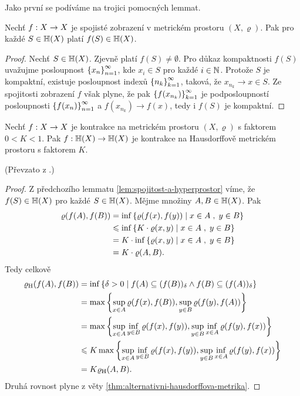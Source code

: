 Jako první se podíváme na trojici pomocných lemmat.
\begin{lemma}\label{lem:spojitost-a-hyperprostor}
    Nechť $f:X \rightarrow X$ je spojisté zobrazení v metrickém prostoru $(X,\varrho)$. Pak pro každé $S\in\mathbb{H}(X)$ platí $f(S)\in\mathbb{H}(X)$.
\end{lemma}
\begin{proof}
    Nechť $S\in\mathbb{H}(X)$. Zjevně platí $f(S)\neq\emptyset$. Pro důkaz kompaktnosti $f(S)$ uvažujme posloupnost $\left\{x_n\right\}_{n=1}^\infty$, kde $x_i\in S$ pro každé $i\in\mathbb{N}$. Protože $S$ je kompaktní, existuje posloupnost indexů $\left\{n_k\right\}_{k=1}^\infty$, taková, že $x_{n_k}\to x\in S$. Ze spojitosti zobrazení $f$ však plyne, že pak $\left\{f(x_{n_k})\right\}_{k=1}^\infty$ je podposloupností posloupnosti $\left\{f(x_n)\right\}_{n=1}^\infty$ a $f(x_{n_k})\to f(x)$, tedy i $f(S)$ je kompaktní.
\end{proof}
\begin{lemma}\label{lem:kontrakce-a-hyperprostor}
    Nechť $f:X \rightarrow X$ je kontrakce na metrickém prostoru $(X,\varrho)$ s faktorem $0<K<1$. Pak $f:\mathbb{H}(X) \rightarrow \mathbb{H}(X)$ je kontrakce na Hausdorffově metrickém prostoru s faktorem $K$.
\end{lemma}
(Převzato z \citep[str. 79]{Barnsley1993}.)
\begin{proof}
    Z předchozího lemmatu \ref{lem:spojitost-a-hyperprostor} víme, že $f(S)\in\mathbb{H}(X)$ pro každé $S\in\mathbb{H}(X)$. Mějme množiny $A,B\in\mathbb{H}(X)$. Pak
    \begin{align*}
        \varrho(f(A),f(B))&=\inf\left\{\varrho(f(x),f(y))\mid x\in A\;,\;y\in B\right\}\\
        &\leqslant\inf\left\{K\cdot\varrho(x,y)\mid x\in A\;,\;y\in B\right\}\\
        &=K\cdot\inf\left\{\varrho(x,y)\mid x\in A\;,\;y\in B\right\}\\
        &=K\cdot\varrho(A,B).
    \end{align*}
    Tedy celkově
    \begin{align*}
        \varrho_\textup{H}(f(A),f(B))&=\inf\left\{\delta>0\mid f(A)\subseteq(f(B))_\delta\land f(B)\subseteq(f(A))_\delta\right\}\\
        &=\max\left\{\sup_{x\in A}\varrho(f(x),f(B)),\sup_{y\in B}\varrho(f(y),f(A))\right\}\\
        &=\max\left\{\sup_{x\in A}\inf_{y\in B}\varrho(f(x),f(y)),\sup_{y\in B}\inf_{x\in A}\varrho(f(y),f(x))\right\}\\
        &\leqslant K\max\left\{\sup_{x\in A}\inf_{y\in B}\varrho(f(x),f(y)),\sup_{y\in B}\inf_{x\in A}\varrho(f(y),f(x))\right\}\\
        &=K\varrho_\textup{H}(A,B).
    \end{align*}
    Druhá rovnost plyne z věty \ref{thm:alternativni-hausdorffova-metrika}.
\end{proof}
